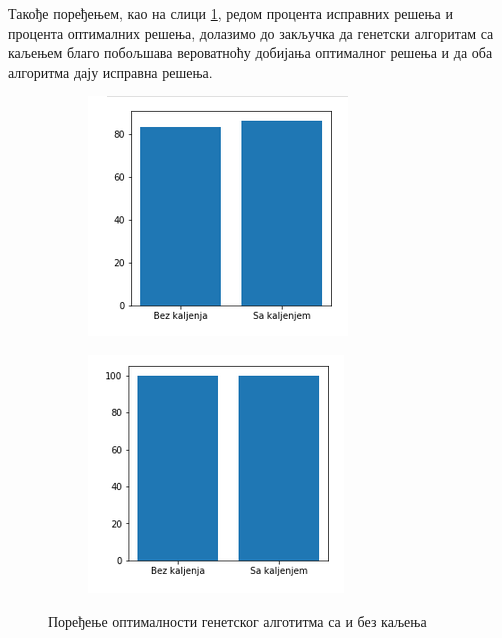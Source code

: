 \documentclass[a4paper]{article}
\begin{document}
{Такође поређењем, као на слици \ref{optimal_comp}, редом процента исправних решења и процента оптималних решења, долазимо до закључка да генетски алгоритам са каљењем благо побољшава вероватноћу добијања оптималног решења и да оба алгоритма дају исправна решења.

\begin{figure}[h!]
	\centering
	\begin{subfigure}{.4\textwidth}
		\centering
		\includegraphics[width=\linewidth]{images/optimals_compare.png}
	\end{subfigure}
	\begin{subfigure}{.4\textwidth}
		\centering
		\includegraphics[width=\linewidth]{images/valids_compare.png}
	\end{subfigure}
	\caption{Поређење оптималности генетског алготитма са и без каљења}
	\label{optimal_comp}
\end{figure}

}
\end{document}
